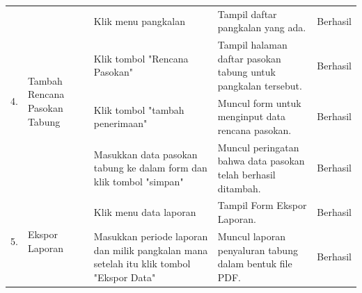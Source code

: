 \begin{longtable}{ |c|p{3cm}|p{3cm}|p{3cm}|p{2cm}|}
	
	\multirow{4}{*}{4.}  & 	\multirow{4}{*}{\parbox{3cm}{\centering Tambah Rencana Pasokan Tabung}} & Klik menu pangkalan           & Tampil daftar pangkalan yang ada.             & Berhasil \\ \cline{3-5}
	& & Klik tombol "Rencana Pasokan"           & Tampil halaman daftar pasokan tabung untuk pangkalan tersebut.             & Berhasil \\ \cline{3-5}
	& & Klik tombol "tambah penerimaan"           & Muncul form untuk menginput data rencana pasokan.             & Berhasil \\ \cline{3-5}
	& & Masukkan data pasokan tabung ke dalam form dan klik tombol "simpan"     & Muncul peringatan bahwa data pasokan telah berhasil ditambah.             & Berhasil \\ \hline
	
	\multirow{2}{*}{5.}  & 	\multirow{2}{*}{Ekspor Laporan} & Klik menu data laporan          & Tampil Form Ekspor Laporan.             & Berhasil \\ \cline{3-5}
	& & Masukkan periode laporan dan milik pangkalan mana setelah itu klik tombol "Ekspor Data"     & Muncul laporan penyaluran tabung dalam bentuk file PDF.             & Berhasil \\ \hline
		
	\end{longtable}
	

